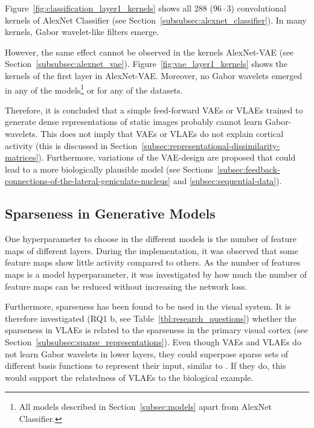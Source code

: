 Figure~\ref{fig:classification_layer1_kernels} shows all 288 ($96 \cdot 3$) convolutional kernels of AlexNet Classifier (see Section~\ref{subsubsec:alexnet_classifier}).
In many kernels, Gabor wavelet-like filters emerge.

However, the same effect cannot be observed in the kernels AlexNet-\ac{VAE} (see Section~\ref{subsubsec:alexnet_vae}).
Figure~\ref{fig:vae_layer1_kernels} shows the kernels of the first layer in AlexNet-\ac{VAE}.
Moreover, no Gabor wavelets emerged in any of the models\footnote{All models described in Section~\ref{subsec:models} apart from AlexNet Classifier.} or for any of the datasets.

Therefore, it is concluded that a simple feed-forward \acp{VAE} or \acp{VLAE} trained to generate dense representations of static images probably cannot learn Gabor-wavelets.
This does not imply that \acp{VAE} or \acp{VLAE} do not explain cortical activity (this is discussed in Section~\ref{subsec:representational-dissimilarity-matrices}).
Furthermore, variations of the \ac{VAE}-design are proposed that could lead to a more biologically plausible model (see Sections~\ref{subsec:feedback-connections-of-the-lateral-geniculate-nucleus} and \ref{subsec:sequential-data}).

\subsection{Sparseness in Generative Models}\label{subsec:effective-network-capacity}
One hyperparameter to choose in the different models is the number of feature maps of different layers.
During the implementation, it was observed that some feature maps show little activity compared to others.
As the number of features maps is a model hyperparameter, it was investigated by how much the number of feature maps can be reduced without increasing the network loss.

Furthermore, sparseness has been found to be used in the visual system.
It is therefore investigated (RQ1 b, see Table~\ref{tbl:research_questions}) whether the sparseness in \acp{VLAE} is related to the sparseness in the primary visual cortex (see Section~\ref{subsubsec:sparse_representations}).
Even though \acp{VAE} and \acp{VLAE} do not learn Gabor wavelets in lower layers, they could superpose sparse sets of different basis functions to represent their input, similar to \citet{Olshausen1996}.
If they do, this would support the relatedness of \acp{VLAE} to the biological example.

